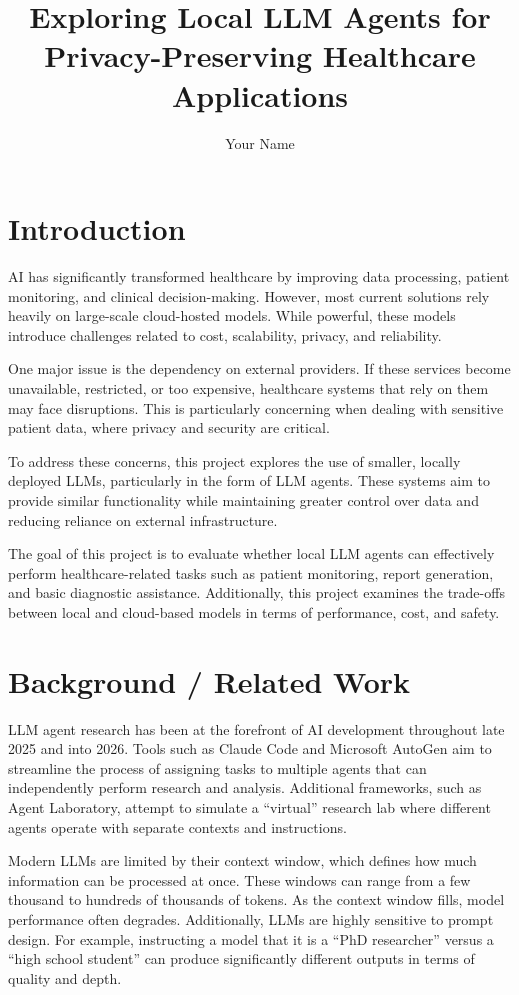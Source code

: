 \documentclass[sigconf]{acmart}
\title{Exploring Local LLM Agents for Privacy-Preserving Healthcare Applications}
\author{Your Name}
\affiliation{
  \institution{Your University}
  \city{City}
  \country{Country}
}
\begin{document}
\maketitle

\section{Introduction}

AI has significantly transformed healthcare by improving data processing, patient monitoring, and clinical decision-making. However, most current solutions rely heavily on large-scale cloud-hosted models. While powerful, these models introduce challenges related to cost, scalability, privacy, and reliability.

One major issue is the dependency on external providers. If these services become unavailable, restricted, or too expensive, healthcare systems that rely on them may face disruptions. This is particularly concerning when dealing with sensitive patient data, where privacy and security are critical.

To address these concerns, this project explores the use of smaller, locally deployed LLMs, particularly in the form of LLM agents. These systems aim to provide similar functionality while maintaining greater control over data and reducing reliance on external infrastructure.

The goal of this project is to evaluate whether local LLM agents can effectively perform healthcare-related tasks such as patient monitoring, report generation, and basic diagnostic assistance. Additionally, this project examines the trade-offs between local and cloud-based models in terms of performance, cost, and safety.

\section{Background / Related Work}

LLM agent research has been at the forefront of AI development throughout late 2025 and into 2026. Tools such as Claude Code and Microsoft AutoGen aim to streamline the process of assigning tasks to multiple agents that can independently perform research and analysis. Additional frameworks, such as Agent Laboratory, attempt to simulate a “virtual” research lab where different agents operate with separate contexts and instructions.

Modern LLMs are limited by their context window, which defines how much information can be processed at once. These windows can range from a few thousand to hundreds of thousands of tokens. As the context window fills, model performance often degrades. Additionally, LLMs are highly sensitive to prompt design. For example, instructing a model that it is a “PhD researcher” versus a “high school student” can produce significantly different outputs in terms of quality and depth.
\end{document}
